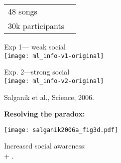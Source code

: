    \begin{tabular}{ll}
      48 songs \\
      30k participants\\    %
    \end{tabular}
  
  \medskip

      
    Exp 1--- weak social \\
    \texttt{[image: ml\_info-v1-original]} 
    
    Exp. 2---strong social\\
    \texttt{[image: ml\_info-v2-original]} 
  
    \medskip
    {\small
      \cite{salganik2006a}
      Salganik et al., Science, 2006.
    }


  \textbf{Resolving the paradox:}

  \begin{center}
    \texttt{[image: salganik2006a\_fig3d.pdf]}
  \end{center}

  {\Large
    Increased social awareness: \\
     + .
  }

